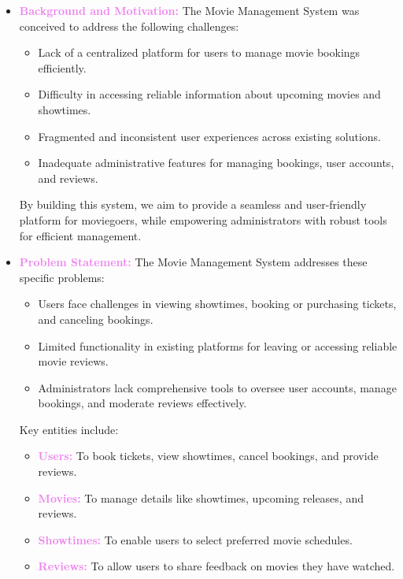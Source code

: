 \documentclass[a4paper,12pt]{article}  %
\renewcommand{\textbf}[1]{\textcolor{violet}{\bfseries #1}}
\begin{document}
\begin{itemize}
    \item \textbf{Background and Motivation:}  
    The Movie Management System was conceived to address the following challenges:  
    \begin{itemize}
        \item Lack of a centralized platform for users to manage movie bookings efficiently.  
        \item Difficulty in accessing reliable information about upcoming movies and showtimes.  
        \item Fragmented and inconsistent user experiences across existing solutions.  
        \item Inadequate administrative features for managing bookings, user accounts, and reviews.  
    \end{itemize}  
    By building this system, we aim to provide a seamless and user-friendly platform for moviegoers, while empowering administrators with robust tools for efficient management.  

    \item \textbf{Problem Statement:}  
    The Movie Management System addresses these specific problems:  
    \begin{itemize}
        \item Users face challenges in viewing showtimes, booking or purchasing tickets, and canceling bookings.  
        \item Limited functionality in existing platforms for leaving or accessing reliable movie reviews.  
        \item Administrators lack comprehensive tools to oversee user accounts, manage bookings, and moderate reviews effectively.  
    \end{itemize}  
    Key entities include:  
    \begin{itemize}
        \item \textbf{Users:} To book tickets, view showtimes, cancel bookings, and provide reviews.  
        \item \textbf{Movies:} To manage details like showtimes, upcoming releases, and reviews.  
        \item \textbf{Showtimes:} To enable users to select preferred movie schedules.  
        \item \textbf{Reviews:} To allow users to share feedback on movies they have watched.  
    \end{itemize}  


\end{itemize}
\end{document}
